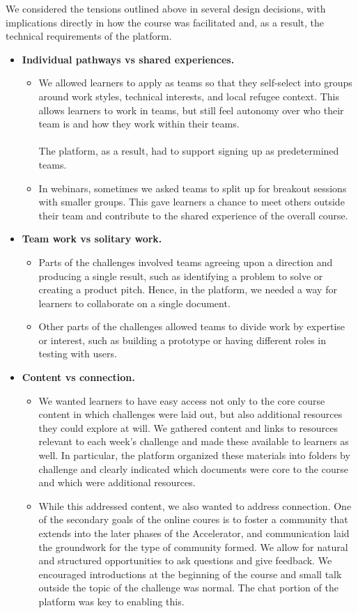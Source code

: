 \documentclass[12pt,twoside]{mitthesis}
\newcommand{\draft}[1]{{\color{blue} #1}}
\begin{document}
\draft{We considered the tensions outlined above in several design decisions, with implications directly in how the course was facilitated and, as a result, the technical requirements of the platform.

\begin{itemize}
\item \textbf{Individual pathways vs shared experiences.}
\begin{itemize}
	\item We allowed learners to apply as teams so that they self-select into groups around work styles, technical interests, and local refugee context. This allows learners to work in teams, but still feel autonomy over who their team is and how they work within their teams.\\ \\The platform, as a result, had to support signing up as predetermined teams.
	\item In webinars, sometimes we asked teams to split up for breakout sessions with smaller groups. This gave learners a chance to meet others outside their team and contribute to the shared experience of the overall course.
\end{itemize}
\item \textbf{Team work vs solitary work.}
\begin{itemize}
	\item Parts of the challenges involved teams agreeing upon a direction and producing a single result, such as identifying a problem to solve or creating a product pitch. Hence, in the platform, we needed a way for learners to collaborate on a single document.
	\item Other parts of the challenges allowed teams to divide work by expertise or interest, such as building a prototype or having different roles in testing with users.
\end{itemize}
\item \textbf{Content vs connection.} 
\begin{itemize}
	\item We wanted learners to have easy access not only to the core course content in which challenges were laid out, but also additional resources they could explore at will. We gathered content and links to resources relevant to each week's challenge and made these available to learners as well. In particular, the platform organized these materials into folders by challenge and clearly indicated which documents were core to the course and which were additional resources.
	\item While this addressed content, we also wanted to address connection. One of the secondary goals of the online coures is to foster a community that extends into the later phases of the Accelerator, and communication laid the groundwork for the type of community formed. We allow for natural and structured opportunities to ask questions and give feedback. We encouraged introductions at the beginning of the course and small talk outside the topic of the challenge was normal. The chat portion of the platform was key to enabling this.
\end{itemize}
\end{itemize}

}
\end{document}
